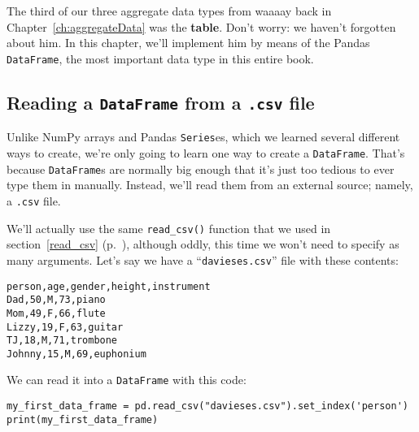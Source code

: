
\chapter[Tables in Python (1 of 3)]{\huge\selectfont{Tables in Python (1 of
3)}}

\label{tablesInPython1}
\label{dataframes}


The third of our three aggregate data types from waaaay back in
Chapter~\ref{ch:aggregateData} was the \textbf{table}. Don't worry: we haven't
forgotten about him. In this chapter, we'll implement him by means of the
Pandas \texttt{DataFrame}, the most important data type in this entire book.

\section{Reading a \texttt{DataFrame} from a \texttt{.csv} file}


Unlike NumPy arrays and Pandas \texttt{Series}es, which we learned several
different ways to create, we're only going to learn one way to create a
\texttt{DataFrame}. That's because \texttt{DataFrame}s are normally big enough
that it's just too tedious to ever type them in manually. Instead, we'll read
them from an external source; namely, a \texttt{.csv} file.


We'll actually use the same \texttt{read\_csv()} function that we used in
section~\ref{read_csv} (p.~\pageref{read_csv}), although oddly, this time we
won't need to specify as many arguments. Let's say we have a
``\texttt{davieses.csv}'' file with these contents:


\begin{Verbatim}[fontsize=\small,samepage=true,frame=lines,framesep=3mm]
person,age,gender,height,instrument
Dad,50,M,73,piano
Mom,49,F,66,flute
Lizzy,19,F,63,guitar
TJ,18,M,71,trombone
Johnny,15,M,69,euphonium
\end{Verbatim}

We can read it into a \texttt{DataFrame} with this code:

\begin{Verbatim}[fontsize=\small,samepage=true,frame=single,framesep=3mm]
my_first_data_frame = pd.read_csv("davieses.csv").set_index('person')
print(my_first_data_frame)
\end{Verbatim}
\vspace{-.2in}

